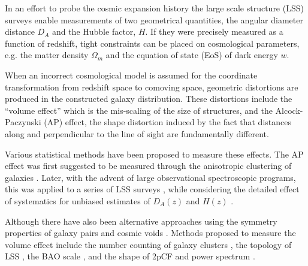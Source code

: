 \documentclass[iop]{emulateapj}
\begin{document}
In an effort to probe the cosmic expansion history the large scale structure (LSS) surveys enable measurements of two geometrical quantities, 
the angular diameter distance $D_A$ and the Hubble factor, $H$. 
If they were precisely measured as a function of redshift, 
tight constraints can be placed on cosmological parameters, 
e.g. the matter density $\Omega_m$ and the equation of state (EoS) of dark energy $w$.

When an incorrect cosmological model is assumed for the coordinate transformation from redshift space to comoving space,
geometric distortions are produced in the constructed galaxy distribution. 
These distortions include the ``volume effect'' which is the mis-scaling of the size of structures,
and the Alcock-Paczynski (AP) effect, the shape distortion induced by the fact that distances along and perpendicular to the line of sight are fundamentally different.

Various statistical methods have been proposed to measure these effects.
The AP effect was first suggested to be measured through the anisotropic clustering of galaxies \citep{Ballinger1996,Matsubara1996}. Later, with the advent of large observational spectroscopic programs, this was applied to a series of LSS surveys
\citep{Outram2004,Blake2011,ChuangWang2012,Reid2012,Beutler2013,Linder2013,2014arXiv1407.2257S, Jeong2014,Sutter2014,2014ApJ...781...96L,Alam2016, Beutler2016, Sanchez2016}, while considering the detailed effect of systematics for unbiased estimates of $D_A(z)$ and $H(z)$ \citep{2014MNRAS.445....2V,2016MNRAS.tmp.1473R,2016arXiv160302389S}.

Although there have also been alternative approaches using the symmetry properties of galaxy pairs \citep{Marinoni2010,Jennings2011,BB2012}
and cosmic voids \citep{Ryden1995,LavausWandelt1995,Sutter2014,Qingqing2016}.
Methods proposed to measure the volume effect include the number counting of 
galaxy clusters \citep{PS1974,VL1996}, the topology of LSS \citep{topology},
the BAO scale \citep{EHT1998,BG03,SE03},
and the shape of 2pCF and power spectrum \citep{Sanchez2006,Sanchez2009}.
\end{document}
